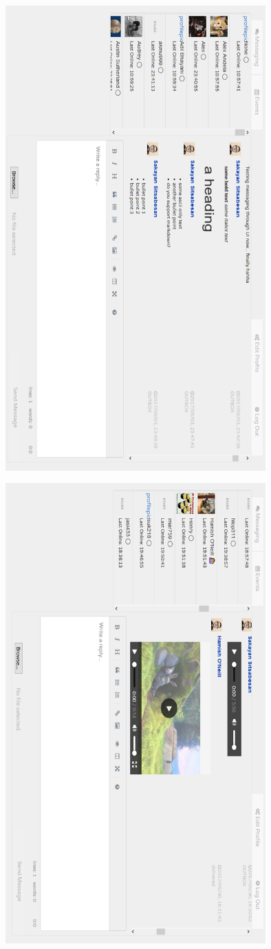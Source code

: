 \documentclass[a4paper,10pt,twoside]{article}
\begin{document}
\begin{center}
\includegraphics[width=0.75\textwidth]{appendix5.png}

\includegraphics[width=0.75\textwidth]{appendix6.png}

\end{center}

\newpage
\mbox{}
\newpage
\end{document}
